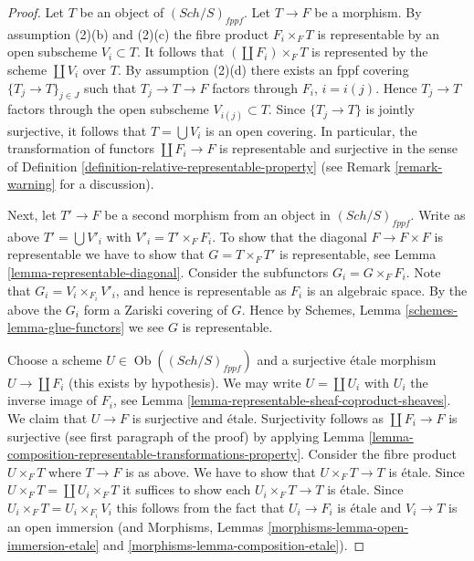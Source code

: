 \documentclass{stacks-project}
\theoremstyle{plain}
\theoremstyle{definition}
\theoremstyle{remark}
\numberwithin{equation}{subsection}
\def\Sch{\mathit{Sch}}
\def\Ob{\mathop{\mathrm{Ob}}\nolimits}
\begin{document}
\begin{proof}
Let $T$ be an object of $(\Sch/S)_{fppf}$. Let $T \to F$ be a morphism.
By assumption (2)(b) and (2)(c) the fibre product $F_i \times_F T$
is representable by an open subscheme $V_i \subset T$. It follows that
$(\coprod F_i) \times_F T$ is represented by the scheme $\coprod V_i$ over $T$.
By assumption (2)(d) there exists an fppf covering $\{T_j \to T\}_{j \in J}$
such that $T_j \to T \to F$ factors through $F_i$, $i = i(j)$.
Hence $T_j \to T$ factors through the open subscheme $V_{i(j)} \subset T$.
Since $\{T_j \to T\}$ is jointly surjective, it follows that
$T = \bigcup V_i$ is an open covering. In particular, the transformation
of functors $\coprod F_i \to F$ is representable
and surjective in the sense of
Definition \ref{definition-relative-representable-property}
(see Remark \ref{remark-warning} for a discussion).

\medskip\noindent
Next, let $T' \to F$ be a second morphism from an object in $(\Sch/S)_{fppf}$.
Write as above $T' = \bigcup V'_i$ with $V'_i = T' \times_F F_i$.
To show that the diagonal $F \to F \times F$ is representable
we have to show that $G = T \times_F T'$ is representable, see
Lemma \ref{lemma-representable-diagonal}.
Consider the subfunctors $G_i = G \times_F F_i$.
Note that $G_i = V_i \times_{F_i} V'_i$, and hence is representable
as $F_i$ is an algebraic space.
By the above the $G_i$ form a Zariski covering of $G$.
Hence by Schemes, Lemma \ref{schemes-lemma-glue-functors}
we see $G$ is representable.

\medskip\noindent
Choose a scheme $U \in \Ob((\Sch/S)_{fppf})$ and a surjective
\'etale morphism $U \to \coprod F_i$ (this exists by hypothesis).
We may write $U = \coprod U_i$ with $U_i$ the inverse image of $F_i$,
see Lemma \ref{lemma-representable-sheaf-coproduct-sheaves}.
We claim that $U \to F$ is surjective and \'etale. Surjectivity follows
as $\coprod F_i \to F$ is surjective (see first paragraph of the proof)
by applying
Lemma \ref{lemma-composition-representable-transformations-property}.
Consider the fibre product $U \times_F T$ where $T \to F$ is as
above. We have to show that $U \times_F T \to T$ is \'etale.
Since $U \times_F T = \coprod U_i \times_F T$ it suffices to show
each $U_i \times_F T \to T$ is \'etale. Since
$U_i \times_F T = U_i \times_{F_i} V_i$ this follows from the
fact that $U_i \to F_i$ is \'etale and $V_i \to T$ is an open immersion
(and Morphisms, Lemmas \ref{morphisms-lemma-open-immersion-etale}
and \ref{morphisms-lemma-composition-etale}).
\end{proof}
\end{document}
